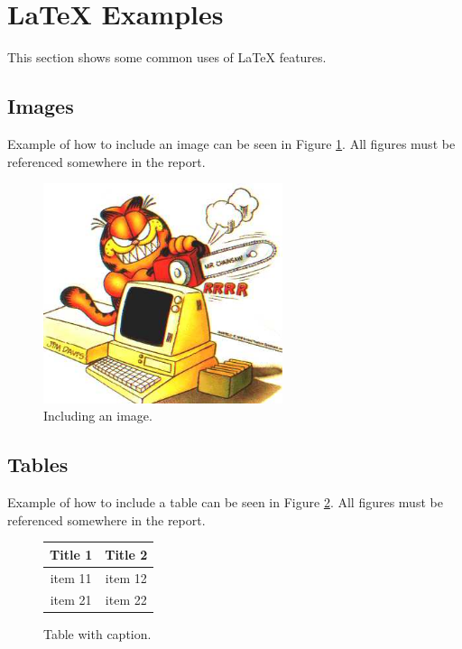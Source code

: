 \documentclass[12pt,a4paper]{article}
\begin{document}
\section{\LaTeX{} Examples} %
This section shows some common uses of \LaTeX{} features.
\subsection{Images}
Example of how to include an image can be seen in Figure \ref{fig:graphicfile}. All figures must be referenced somewhere in the report.
\begin{figure}[htb]
\begin{center}
\includegraphics[width=7cm]{garfield}
\caption{Including an image.}
\label{fig:graphicfile} %
\end{center}
\end{figure}

\subsection{Tables}
Example of how to include a table can be seen in Figure \ref{fig:someTable}. All figures must be referenced somewhere in the report.
\begin{figure}[h]
\begin{center}
\begin{tabular}{|c|c|}
\hline
\textbf{Title 1} & \textbf{Title 2} \\
\hline
item 11	&	item 12	\\
\hline
item 21	&	item 22	\\
\hline
\end{tabular}
\end{center}
\caption{Table with caption.}
\label{fig:someTable}
\end{figure}
\end{document}

